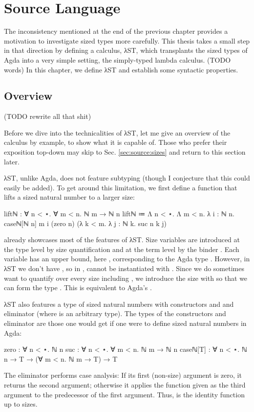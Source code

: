 \chapter{Source Language}
\label{sec:source}

The inconsistency mentioned at the end of the previous chapter provides a
motivation to investigate sized types more carefully. This thesis takes a small
step in that direction by defining a calculus, λST, which transplants the sized
types of Agda into a very simple setting, the simply-typed lambda calculus.
(TODO words) In this chapter, we define λST and establish some syntactic
properties.


\section{Overview}
\label{sec:source:overview}

(TODO rewrite all that shit)

Before we dive into the technicalities of λST, let me give an overview of the
calculus by example, to show what it is capable of. Those who prefer their
exposition top-down may skip to Sec. \ref{sec:source:sizes} and return to this
section later.

λST, unlike Agda, does not feature subtyping (though I conjecture that this
could easily be added). To get around this limitation, we first define a
function that lifts a sized natural number to a larger size:
\begin{code}
  liftℕ : ∀ n < ⋆. ∀ m < n. ℕ m → ℕ n
  liftℕ ≔ Λ n < ⋆. Λ m < n. λ i : ℕ n.
          caseℕ[ℕ n] m i
            (zero n)
            (λ k < m. λ j : ℕ k. suc n k j)
\end{code}

 already showcases most of the features of λST. Size variables are
introduced at the type level by size quantification  and at
the term level by the binder . Each variable has an upper
bound, here , corresponding to the Agda type . However,
in λST we don't have , so in ,  cannot
be instantiated with . Since we do sometimes want to quantify over
every size including , we introduce the size  with
 so that we can form the type . This is
equivalent to Agda's .

λST also features a type of sized natural numbers  with constructors
 and  and eliminator  (where  is
an arbitrary type). The types of the constructors and eliminator are those one
would get if one were to define sized natural numbers in Agda:
\begin{code}
  zero     : ∀ n < ⋆. ℕ n
  suc      : ∀ n < ⋆. ∀ m < n. ℕ m → ℕ n
  caseℕ[T] : ∀ n < ⋆. ℕ n → T → (∀ m < n. ℕ m → T) → T
\end{code}
The  eliminator performs case analysis: If its first (non-size)
argument is zero, it returns the second argument; otherwise it applies the
function given as the third argument to the predecessor of the first argument.
Thus,  is the identity function up to sizes.

